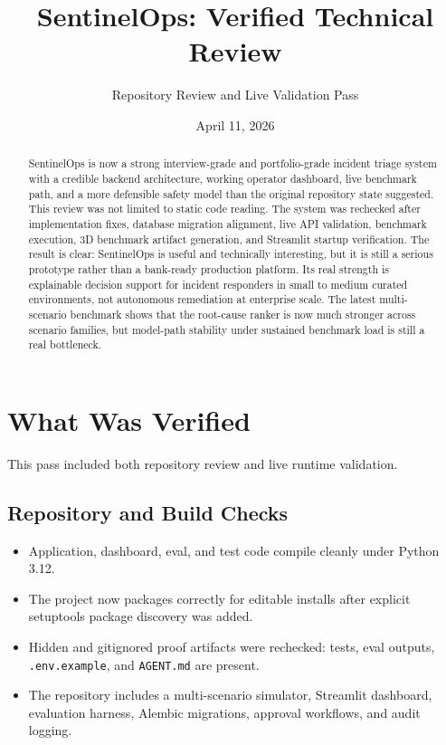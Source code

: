 \documentclass[11pt]{article}
\title{SentinelOps: Verified Technical Review}
\author{Repository Review and Live Validation Pass}
\date{April 11, 2026}
\begin{document}
\maketitle

\begin{abstract}
SentinelOps is now a strong interview-grade and portfolio-grade incident triage system with a credible backend architecture, working operator dashboard, live benchmark path, and a more defensible safety model than the original repository state suggested. This review was not limited to static code reading. The system was rechecked after implementation fixes, database migration alignment, live API validation, benchmark execution, 3D benchmark artifact generation, and Streamlit startup verification. The result is clear: SentinelOps is useful and technically interesting, but it is still a serious prototype rather than a bank-ready production platform. Its real strength is explainable decision support for incident responders in small to medium curated environments, not autonomous remediation at enterprise scale. The latest multi-scenario benchmark shows that the root-cause ranker is now much stronger across scenario families, but model-path stability under sustained benchmark load is still a real bottleneck.
\end{abstract}

\section{What Was Verified}
This pass included both repository review and live runtime validation.

\subsection{Repository and Build Checks}
\begin{itemize}[leftmargin=*]
\item Application, dashboard, eval, and test code compile cleanly under Python 3.12.
\item The project now packages correctly for editable installs after explicit setuptools package discovery was added.
\item Hidden and gitignored proof artifacts were rechecked: tests, eval outputs, \texttt{.env.example}, and \texttt{AGENT.md} are present.
\item The repository includes a multi-scenario simulator, Streamlit dashboard, evaluation harness, Alembic migrations, approval workflows, and audit logging.
\end{itemize}
\end{document}
